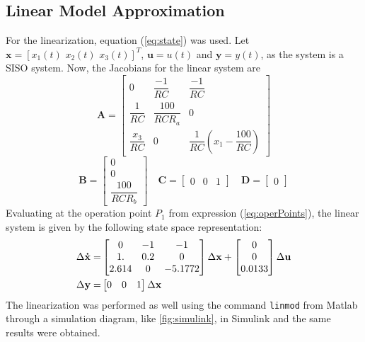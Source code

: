 \subsection{Linear Model Approximation}
For the linearization, equation (\ref{eq:state}) was used. Let $\mathbf{x}=[x_1(t)\,\, x_2(t)\,\, x_3(t)]^T$, $\mathbf{u}=u(t)$ and $\mathbf{y}=y(t)$, as the system is a SISO system. Now, the Jacobians for the linear system are
\begingroup
\renewcommand*{\arraystretch}{1.9}
\begin{equation*}
\mathbf{A} = 
\begin{bmatrix}
0 & \dfrac{-1}{RC} & \dfrac{-1}{RC}\\
\dfrac{1}{RC} &\dfrac{100}{RCR_a} & 0\\
\dfrac{x_3}{RC} & 0 & \dfrac{1}{RC}\left(x_1-\dfrac{100}{RC}\right)
\end{bmatrix}
\end{equation*}
\endgroup
\begingroup
\renewcommand*{\arraystretch}{1.3}
\begin{equation*}
\mathbf{B} = 
\begin{bmatrix}
0\\
0\\
\dfrac{100}{RCR_b}
\end{bmatrix}\quad \mathbf{C} = 
\begin{bmatrix}
0 & 0 & 1
\end{bmatrix}\quad \mathbf{D} = \begin{bmatrix}
0 
\end{bmatrix}
\end{equation*}
\endgroup
Evaluating at the operation point $P_1$ from expression (\ref{eq:operPoints}), the linear system is given by the following state space representation:
\begin{equation}\label{eq:LinearizedModel}
\begin{split}
    \Delta\mathbf{\dot{x}} =& \begin{bmatrix}
0 & -1 & -1\\
1. &0.2 & 0\\
2.614 & 0 & -5.1772
\end{bmatrix} \Delta\mathbf{x}+\begin{bmatrix}
0\\
0\\
0.0133 
\end{bmatrix}\Delta\mathbf{u}\\\vspace{5mm}
    \Delta\mathbf{y}=&\begin{bmatrix}
0 & 0 & 1
\end{bmatrix}\Delta\mathbf{x}
\end{split}
\end{equation}
The linearization was performed as well using the command \texttt{linmod} from Matlab through a simulation diagram, like \ref{fig:simulink}, in Simulink and the same results were obtained.

